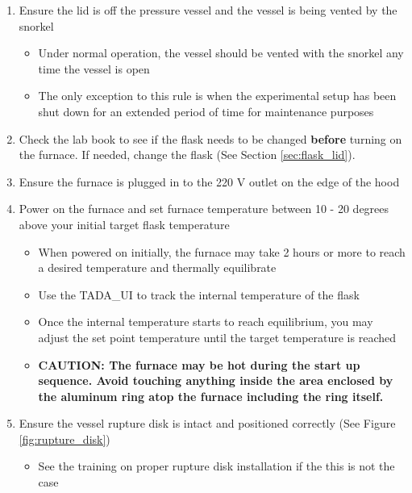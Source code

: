 \documentclass[letterpaper,11pt]{article}
\begin{document}
    \begin{enumerate}
    \item Ensure the lid is off the pressure vessel and the vessel is being 
        vented by the snorkel
        \begin{itemize}
        \item Under normal operation, the vessel should be vented with the 
            snorkel any time the vessel is open
        \item The only exception to this rule is when the experimental setup has
            been shut down for an extended period of time for maintenance 
            purposes
        \end{itemize}
    
    \item Check the lab book to see if the flask needs to be changed  
        \textbf{before} turning on the furnace. 
        If needed, change the flask (See Section \ref{sec:flask_lid}).
    \item Ensure the furnace is plugged in to the 220 V outlet on the edge of 
        the hood
    \item Power on the furnace and set furnace temperature between 10 - 20 
        degrees above your initial target flask temperature 
        \begin{itemize}
        \item When powered on initially, the furnace may take 2 hours or   
            more to reach a desired temperature and thermally equilibrate
        \item Use the TADA\_UI to track the internal temperature of the flask
        \item Once the internal temperature starts to reach equilibrium, you 
            may adjust the set point temperature until the target 
            temperature is reached
        \item \textbf{CAUTION: The furnace may be hot during the start up 
            sequence. Avoid touching anything inside the area enclosed by 
            the aluminum ring atop the furnace including the ring itself.}
        \end{itemize}
    
    \item Ensure the vessel rupture disk is intact and positioned correctly 
        (See Figure \ref{fig:rupture_disk})
        \begin{itemize}
        \item See the training on proper rupture disk installation if the this is not the case
        \end{itemize} 
    

\end{enumerate}
\end{document}
